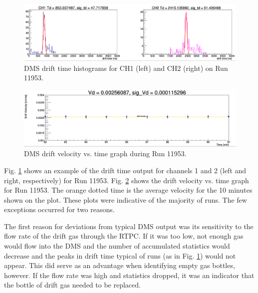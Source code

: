 \begin{figure}[h!]
	\centering
	\includegraphics[width=0.9\linewidth]{figures/DMS_11953_time.png}
	\caption{DMS drift time histograms for CH1 (left) and CH2 (right) on Run 11953.}
	\label{fig:dms_11953_time}
\end{figure}
\begin{figure}[h!]
	\centering
	\includegraphics[width=0.9\linewidth]{figures/DMS_11953_velocity.png}
	\caption{DMS drift velocity vs. time graph during Run 11953.}
	\label{fig:dms_11953_velocity}
\end{figure}

Fig. \ref{fig:dms_11953_time} shows an example of the drift time output for channels 1 and 2 (left and right, respectively) for Run 11953. Fig. \ref{fig:dms_11953_velocity} shows the drift velocity vs. time graph for Run 11953. The orange dotted time is the average velocity for the 10 minutes shown on the plot. These plots were indicative of the majority of runs. The few exceptions occurred for two reasons. 

The first reason for deviations from typical DMS output was its sensitivity to the flow rate of the drift gas through the RTPC. If it was too low, not enough gas would flow into the DMS and the number of accumulated statistics would decrease and the peaks in drift time typical of runs (as in Fig. \ref{fig:dms_11953_time}) would not appear. This did serve as an advantage when identifying empty gas bottles, however. If the flow rate was high and statistics dropped, it was an indicator that the bottle of drift gas needed to be replaced.

